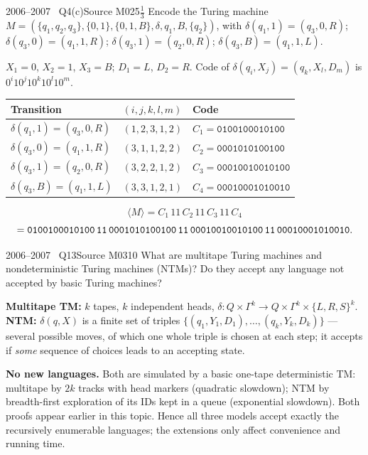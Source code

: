 \documentclass[11pt,a4paper]{article}
\begin{document}
\begin{question}{2006--2007 \textbullet\ Q4(c)}{Source M02}{5$\tfrac13$}
Encode the Turing machine $M=(\{q_1,q_2,q_3\},\{0,1\},\{0,1,B\},\delta,q_1,B,\{q_2\})$, with $\delta(q_1,1)=(q_3,0,R)$; $\delta(q_3,0)=(q_1,1,R)$; $\delta(q_3,1)=(q_2,0,R)$; $\delta(q_3,B)=(q_1,1,L)$.
\end{question}
\begin{solution}
$X_1=0$, $X_2=1$, $X_3=B$; $D_1=L$, $D_2=R$. Code of $\delta(q_i,X_j)=(q_k,X_l,D_m)$ is $0^i10^j10^k10^l10^m$.
\begin{center}\small\begin{tabular}{lll}\toprule Transition & $(i,j,k,l,m)$ & Code\\\midrule
$\delta(q_1,1)=(q_3,0,R)$ & $(1,2,3,1,2)$ & $C_1=\texttt{0100100010100}$\\
$\delta(q_3,0)=(q_1,1,R)$ & $(3,1,1,2,2)$ & $C_2=\texttt{0001010100100}$\\
$\delta(q_3,1)=(q_2,0,R)$ & $(3,2,2,1,2)$ & $C_3=\texttt{00010010010100}$\\
$\delta(q_3,B)=(q_1,1,L)$ & $(3,3,1,2,1)$ & $C_4=\texttt{00010001010010}$\\\bottomrule\end{tabular}\end{center}
\[\langle M\rangle=C_1\,11\,C_2\,11\,C_3\,11\,C_4\]
\[=\texttt{0100100010100\,11\,0001010100100\,11\,00010010010100\,11\,00010001010010}.\]
\end{solution}

\begin{question}{2006--2007 \textbullet\ Q13}{Source M03}{10}
What are multitape Turing machines and nondeterministic Turing machines (NTMs)? Do they accept any language not accepted by basic Turing machines?
\end{question}
\begin{solution}
\textbf{Multitape TM:} $k$ tapes, $k$ independent heads, $\delta:Q\times\Gamma^k\to Q\times\Gamma^k\times\{L,R,S\}^k$. \textbf{NTM:} $\delta(q,X)$ is a finite set of triples $\{(q_1,Y_1,D_1),\dots,(q_k,Y_k,D_k)\}$ --- several possible moves, of which one whole triple is chosen at each step; it accepts if \emph{some} sequence of choices leads to an accepting state.

\textbf{No new languages.} Both are simulated by a basic one-tape deterministic TM: multitape by $2k$ tracks with head markers (quadratic slowdown); NTM by breadth-first exploration of its IDs kept in a queue (exponential slowdown). Both proofs appear earlier in this topic. Hence all three models accept exactly the recursively enumerable languages; the extensions only affect convenience and running time.
\end{solution}
\end{document}
